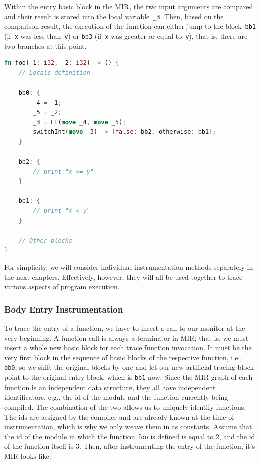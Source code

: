 \documentclass{article}
\begin{document}
Within the entry basic block in the \ac{MIR}, the two input arguments are compared and their result is stored into the local variable~\lstinline{_3}. Then, based on the comparison result, the execution of the function can either jump to the block~\lstinline{bb1} (if~\lstinline{x} was less than~\lstinline{y}) or \lstinline{bb3} (if~\lstinline{x} was greater or equal to~\lstinline{y}), that is, there are two branches at this point.
\begin{lstlisting}[language=Rust, style=boxed, caption={MIR of the \lstinline{foo} function}, label=lst:mir-of-example-function-to-instrument]
fn foo(_1: i32, _2: i32) -> () {
    // Locals definition

    bb0: {
        _4 = _1;
        _5 = _2;
        _3 = Lt(move _4, move _5);
        switchInt(move _3) -> [false: bb2, otherwise: bb1];
    }

    bb2: {
        // print "x >= y"
    }

    bb1: {
        // print "x < y"
    }

    // Other blocks
}
\end{lstlisting}

For simplicity, we will consider individual instrumentation methods separately in the next chapters. Effectively, however, they will all be used together to trace various aspects of program execution.

\subsubsection{Body Entry Instrumentation}
To trace the entry of a function, we have to insert a call to our monitor at the very beginning. A function call is always a terminator in \ac{MIR}; that is, we must insert a whole new basic block for each trace function invocation. It must be the very first block in the sequence of basic blocks of the respective function, i.e., \lstinline{bb0}, so we shift the original blocks by one and let our new artificial tracing block point to the original entry block, which is \lstinline{bb1} now. Since the \ac{MIR} graph of each function is an independent data structure, they all have independent identificators, e.g., the id of the module and the function currently being compiled. The combination of the two allows us to uniquely identify functions. The ids are assigned by the compiler and are already known at the time of instrumentation, which is why we only weave them in as constants. Assume that the id of the module in which the function \lstinline{foo} is defined is equal to $2$, and the id of the function itself is $3$. Then, after instrumenting the entry of the function, it's \ac{MIR} looks like:
\end{document}
